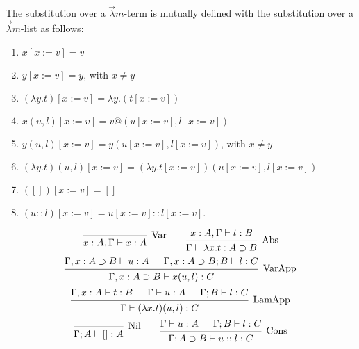 \begin{definition}
  The substitution over a $\vec \lambda m$-term is mutually defined with the substitution over a $\vec \lambda m$-list as follows:
  
  \begin{enumerate}
  \item $x[x := v] = v$
  \item $y[x := v] = y \text{, with } x \neq y$
  \item $(\lambda y . t)[x := v] = \lambda y . (t[x := v])$
  \item $x(u, l)[x := v] = v @ (u[x := v], l[x := v])$
  \item $y(u, l)[x := v] = y(u[x := v], l[x := v]) \text{, with } x \neq y$
  \item $(\lambda y . t)(u, l)[x := v] = (\lambda y . t[x := v])(u[x := v], l[x := v])$    
    
  \item $([])[x := v] = []$
  \item $(u::l)[x := v] = u[x := v] :: l[x := v]$.
  \end{enumerate}
\end{definition}

\begin{definition}
  \[
    \begin{prooftree}
      \infer0[Var]{ x:A, \Gamma \vdash x:A } 
    \end{prooftree}
    \qquad
    \begin{prooftree}
      \hypo{ x:A, \Gamma \vdash t:B }
      \infer1[Abs]{ \Gamma \vdash \lambda x . t : A \supset B  } 
    \end{prooftree}
  \]
  \[
    \begin{prooftree}
      \hypo{ \Gamma, x:A \supset B \vdash u:A}
      \hypo{ \Gamma, x:A \supset B ; B \vdash l:C }	
      \infer2[VarApp]{ \Gamma, x:A \supset B \vdash x(u, l) : C } 
    \end{prooftree}
  \]
  \[
    \begin{prooftree}
      \hypo{ \Gamma, x:A \vdash t:B }
      \hypo{ \Gamma \vdash u:A }
      \hypo{ \Gamma ; B \vdash l : C }	
      \infer3[LamApp]{ \Gamma \vdash (\lambda x . t)(u, l) : C } 
    \end{prooftree}
  \]
  \[
    \begin{prooftree}
      \infer0[Nil]{ \Gamma ; A \vdash []:A } 
    \end{prooftree}
    \qquad
    \begin{prooftree}
      \hypo{ \Gamma \vdash u:A }
      \hypo{ \Gamma ; B \vdash l:C }
      \infer2[Cons]{ \Gamma ; A \supset B \vdash  u::l : C } 
    \end{prooftree}
  \]
\end{definition}

